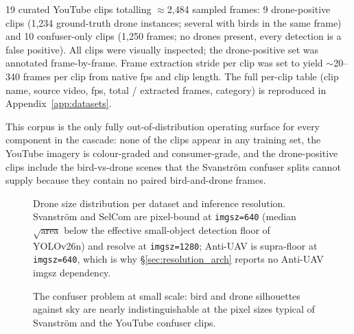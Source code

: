 \documentclass[12pt,a4paper,oneside,openright]{book}
\begin{document}
19 curated YouTube clips totalling $\approx$2{,}484 sampled frames: 9 drone-positive clips (1{,}234 ground-truth drone instances; several with birds in the same frame) and 10 confuser-only clips (1{,}250 frames; no drones present, every detection is a false positive). All clips were visually inspected; the drone-positive set was annotated frame-by-frame. Frame extraction stride per clip was set to yield $\sim$20--340 frames per clip from native fps and clip length. The full per-clip table (clip name, source video, fps, total / extracted frames, category) is reproduced in Appendix~\ref{app:datasets}.

This corpus is the only fully out-of-distribution operating surface for every component in the cascade: none of the clips appear in any training set, the YouTube imagery is colour-graded and consumer-grade, and the drone-positive clips include the bird-vs-drone scenes that the Svanstr\"om confuser splits cannot supply because they contain no paired bird-and-drone frames.

\begin{figure}[htbp]
    \centering
    \caption{Drone size distribution per dataset and inference resolution. Svanstr\"om and SelCom are pixel-bound at \texttt{imgsz=640} (median $\sqrt{\text{area}}$ below the effective small-object detection floor of YOLOv26n) and resolve at \texttt{imgsz=1280}; Anti-UAV is supra-floor at \texttt{imgsz=640}, which is why \S\ref{sec:resolution_arch} reports no Anti-UAV imgsz dependency.}
    \label{fig:drone_size_hist}
\end{figure}

\begin{figure}[htbp]
    \centering
    \caption{The confuser problem at small scale: bird and drone silhouettes against sky are nearly indistinguishable at the pixel sizes typical of Svanstr\"om and the YouTube confuser clips.}
    \label{fig:confuser_problem}
\end{figure}
\end{document}
